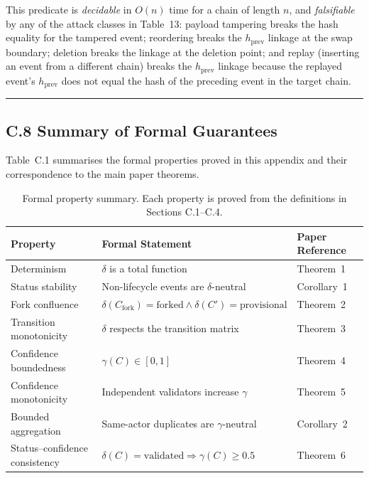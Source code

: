 This predicate is \emph{decidable} in $O(n)$ time for a chain of length $n$, and \emph{falsifiable} by any of the attack classes in Table~13: payload tampering breaks the hash equality for the tampered event; reordering breaks the $h_{\text{prev}}$ linkage at the swap boundary; deletion breaks the linkage at the deletion point; and replay (inserting an event from a different chain) breaks the $h_{\text{prev}}$ linkage because the replayed event's $h_{\text{prev}}$ does not equal the hash of the preceding event in the target chain.

\begin{center}\rule{0.5\linewidth}{0.5pt}\end{center}


\subsection{C.8 Summary of Formal Guarantees}\label{c.8-summary-of-formal-guarantees}

Table~C.1 summarises the formal properties proved in this appendix and their correspondence to the main paper theorems.

\begin{table}[h]
\centering
\caption{Formal property summary. Each property is proved from the definitions in Sections C.1--C.4.}
\label{tab:formal-properties}
\begin{tabular}{@{}lll@{}}
\toprule
\textbf{Property} & \textbf{Formal Statement} & \textbf{Paper Reference} \\
\midrule
Determinism & $\delta$ is a total function & Theorem~1 \\
Status stability & Non-lifecycle events are $\delta$-neutral & Corollary~1 \\
Fork confluence & $\delta(C_{\text{fork}}) = \text{forked} \land \delta(C') = \text{provisional}$ & Theorem~2 \\
Transition monotonicity & $\delta$ respects the transition matrix & Theorem~3 \\
Confidence boundedness & $\gamma(C) \in [0, 1]$ & Theorem~4 \\
Confidence monotonicity & Independent validators increase $\gamma$ & Theorem~5 \\
Bounded aggregation & Same-actor duplicates are $\gamma$-neutral & Corollary~2 \\
Status--confidence consistency & $\delta(C) = \text{validated} \Rightarrow \gamma(C) \geq 0.5$ & Theorem~6 \\
\bottomrule
\end{tabular}
\end{table}
